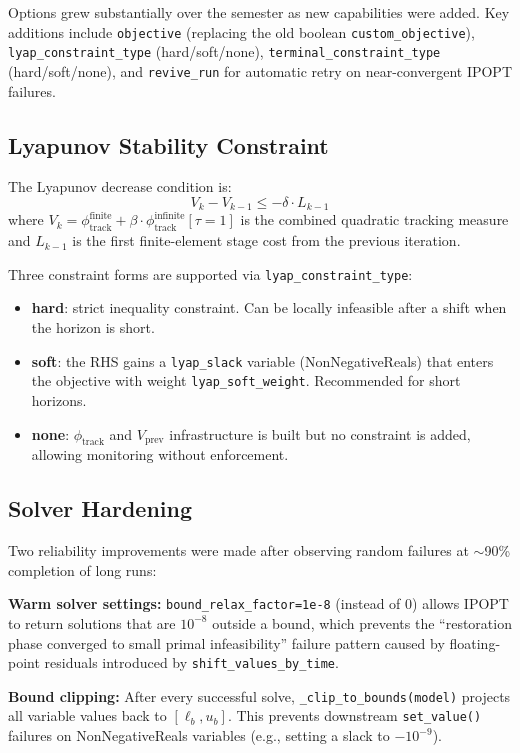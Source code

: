 \documentclass[11pt,letterpaper]{article}
\begin{document}
Options grew substantially over the semester as new capabilities were added. Key additions include \texttt{objective} (replacing the old boolean \texttt{custom\_objective}), \texttt{lyap\_constraint\_type} (hard/soft/none), \texttt{terminal\_constraint\_type} (hard/soft/none), and \texttt{revive\_run} for automatic retry on near-convergent IPOPT failures.

\subsection{Lyapunov Stability Constraint}

The Lyapunov decrease condition is:
\[
  V_k - V_{k-1} \leq -\delta \cdot L_{k-1}
\]
where $V_k = \phi_\text{track}^\text{finite} + \beta \cdot \phi_\text{track}^\text{infinite}[\tau=1]$ is the combined quadratic tracking measure and $L_{k-1}$ is the first finite-element stage cost from the previous iteration.

Three constraint forms are supported via \texttt{lyap\_constraint\_type}:
\begin{itemize}[leftmargin=2em]
  \item \textbf{hard}: strict inequality constraint. Can be locally infeasible after a shift when the horizon is short.
  \item \textbf{soft}: the RHS gains a \texttt{lyap\_slack} variable (NonNegativeReals) that enters the objective with weight \texttt{lyap\_soft\_weight}. Recommended for short horizons.
  \item \textbf{none}: $\phi_\text{track}$ and $V_\text{prev}$ infrastructure is built but no constraint is added, allowing monitoring without enforcement.
\end{itemize}

\subsection{Solver Hardening}

Two reliability improvements were made after observing random failures at $\sim$90\% completion of long runs:

\textbf{Warm solver settings:} \texttt{bound\_relax\_factor=1e-8} (instead of 0) allows IPOPT to return solutions that are $10^{-8}$ outside a bound, which prevents the ``restoration phase converged to small primal infeasibility'' failure pattern caused by floating-point residuals introduced by \texttt{shift\_values\_by\_time}.

\textbf{Bound clipping:} After every successful solve, \texttt{\_clip\_to\_bounds(model)} projects all variable values back to $[\ell_b, u_b]$. This prevents downstream \texttt{set\_value()} failures on NonNegativeReals variables (e.g., setting a slack to $-10^{-9}$).
\end{document}
